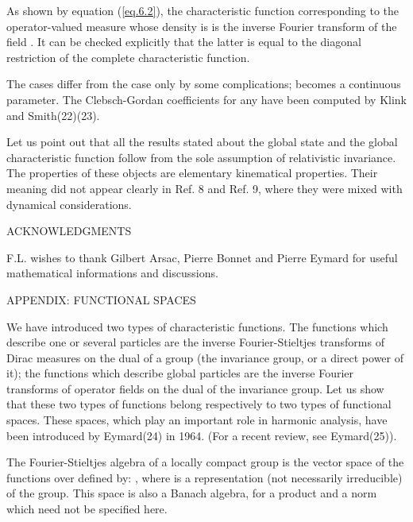 \documentclass[a4paper,11pt]{article}
\begin{document}
As shown by equation (\ref{eq.6.2}), the characteristic function corresponding to the 
operator-valued 
measure whose density is \myHighlight{$\rho_{\chi}$}\coordHE{} is the inverse Fourier transform of the field \myHighlight{$\rho$}\coordHE{}. It 
can be checked 
explicitly that the latter is equal to the diagonal restriction of the complete characteristic 
function. 

The cases \coordHE{} differ from the case \coordHE{} only by some complications; \myHighlight{$\eta$}\coordHE{} becomes a 
continuous 
parameter. The Clebsch-Gordan coefficients for any \coordHE{} have been computed by Klink and 
Smith(22)(23). 

Let us point out that all the results stated about the global state and the global 
characteristic function follow from the sole assumption of relativistic invariance. The 
properties of these objects are elementary kinematical properties. Their meaning did not appear 
clearly in Ref. 8 and Ref. 9, where they were mixed with dynamical considerations. 

ACKNOWLEDGMENTS

F.L. wishes to thank Gilbert Arsac, Pierre Bonnet and Pierre Eymard for useful mathematical informations and discussions. 

APPENDIX: FUNCTIONAL SPACES  

We have introduced two types of characteristic functions. The functions which describe one or 
several particles are the inverse Fourier-Stieltjes transforms of Dirac measures on the dual of 
a group (the invariance group, or a direct power of it); the functions which describe global 
particles are the inverse Fourier transforms of operator fields on the dual of the invariance 
group. Let us show that these two types of functions belong respectively to two types of 
functional spaces. These spaces, which play an important role in harmonic analysis, have been 
introduced by Eymard(24) in 1964. (For a recent review, see Eymard(25)). 

The Fourier-Stieltjes algebra \coordHE{} of a locally compact group \coordHE{} is the vector space of the 
functions over \coordHE{} defined by: \coordHE{} , where \coordHE{} is a representation 
(not necessarily 
irreducible) of the group. This space is also a Banach algebra, for a product and a norm which 
need not be specified here. 
\end{document}
